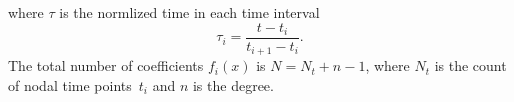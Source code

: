where $\tau$ is the normlized time in each time interval
\begin{equation}
  \tau_i = \frac{t-t_i}{t_{i+1}-t_i}.
\end{equation}
The total number of coefficients $f_i(x)$ is $N=N_t+n-1$,
where $N_t$ is the count of nodal time points~$t_i$ and $n$ is the degree.

